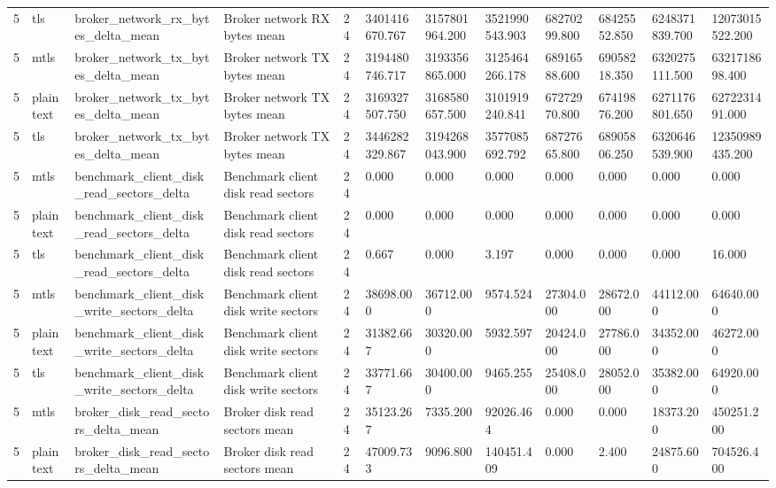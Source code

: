\begin{longtable}{llllllllllll}
5 & tls & broker\_network\_rx\_bytes\_delta\_mean & Broker network RX bytes mean & 24 & 3401416670.767 & 3157801964.200 & 3521990543.903 & 68270299.800 & 68425552.850 & 6248371839.700 & 12073015522.200 \\
5 & mtls & broker\_network\_tx\_bytes\_delta\_mean & Broker network TX bytes mean & 24 & 3194480746.717 & 3193356865.000 & 3125464266.178 & 68916588.600 & 69058218.350 & 6320275111.500 & 6321718698.400 \\
5 & plaintext & broker\_network\_tx\_bytes\_delta\_mean & Broker network TX bytes mean & 24 & 3169327507.750 & 3168580657.500 & 3101919240.841 & 67272970.800 & 67419876.200 & 6271176801.650 & 6272231491.000 \\
5 & tls & broker\_network\_tx\_bytes\_delta\_mean & Broker network TX bytes mean & 24 & 3446282329.867 & 3194268043.900 & 3577085692.792 & 68727665.800 & 68905806.250 & 6320646539.900 & 12350989435.200 \\
5 & mtls & benchmark\_client\_disk\_read\_sectors\_delta & Benchmark client disk read sectors & 24 & 0.000 & 0.000 & 0.000 & 0.000 & 0.000 & 0.000 & 0.000 \\
5 & plaintext & benchmark\_client\_disk\_read\_sectors\_delta & Benchmark client disk read sectors & 24 & 0.000 & 0.000 & 0.000 & 0.000 & 0.000 & 0.000 & 0.000 \\
5 & tls & benchmark\_client\_disk\_read\_sectors\_delta & Benchmark client disk read sectors & 24 & 0.667 & 0.000 & 3.197 & 0.000 & 0.000 & 0.000 & 16.000 \\
5 & mtls & benchmark\_client\_disk\_write\_sectors\_delta & Benchmark client disk write sectors & 24 & 38698.000 & 36712.000 & 9574.524 & 27304.000 & 28672.000 & 44112.000 & 64640.000 \\
5 & plaintext & benchmark\_client\_disk\_write\_sectors\_delta & Benchmark client disk write sectors & 24 & 31382.667 & 30320.000 & 5932.597 & 20424.000 & 27786.000 & 34352.000 & 46272.000 \\
5 & tls & benchmark\_client\_disk\_write\_sectors\_delta & Benchmark client disk write sectors & 24 & 33771.667 & 30400.000 & 9465.255 & 25408.000 & 28052.000 & 35382.000 & 64920.000 \\
5 & mtls & broker\_disk\_read\_sectors\_delta\_mean & Broker disk read sectors mean & 24 & 35123.267 & 7335.200 & 92026.464 & 0.000 & 0.000 & 18373.200 & 450251.200 \\
5 & plaintext & broker\_disk\_read\_sectors\_delta\_mean & Broker disk read sectors mean & 24 & 47009.733 & 9096.800 & 140451.409 & 0.000 & 2.400 & 24875.600 & 704526.400 \\

\end{longtable}
